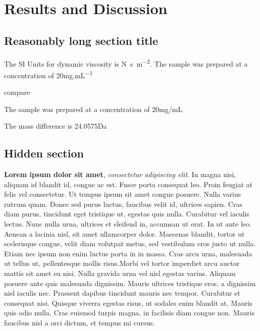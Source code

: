 
\chapter{Results and Discussion}
\label{chapter4}
\ifpdf
    \graphicspath{{Chapter4/Figs/Raster/}{Chapter4/Figs/PDF/}{Chapter4/Figs/}}
\else
    \graphicspath{{Chapter4/Figs/Vector/}{Chapter4/Figs/}}
\fi


\section[Short title]{Reasonably long section title}

The SI Units for dynamic viscosity is \si{\newton\second\per\metre\squared}.
The sample was prepared at a concentration of 20\si{mg}.\si{mL^{-1}}

compare

The sample was prepared at a concentration of 20mg/mL

The mass difference is 24.0575\si{Da}










\clearpage

\tochide\section{Hidden section}
\textbf{Lorem ipsum dolor sit amet}, \textit{consectetur adipiscing elit}. In magna nisi, aliquam id blandit id, congue ac est. Fusce porta consequat leo. Proin feugiat at felis vel consectetur. Ut tempus ipsum sit amet congue posuere. Nulla varius rutrum quam. Donec sed purus luctus, faucibus velit id, ultrices sapien. Cras diam purus, tincidunt eget tristique ut, egestas quis nulla. Curabitur vel iaculis lectus. Nunc nulla urna, ultrices et eleifend in, accumsan ut erat. In ut ante leo. Aenean a lacinia nisl, sit amet ullamcorper dolor. Maecenas blandit, tortor ut scelerisque congue, velit diam volutpat metus, sed vestibulum eros justo ut nulla. Etiam nec ipsum non enim luctus porta in in massa. Cras arcu urna, malesuada ut tellus ut, pellentesque mollis risus.Morbi vel tortor imperdiet arcu auctor mattis sit amet eu nisi. Nulla gravida urna vel nisl egestas varius. Aliquam posuere ante quis malesuada dignissim. Mauris ultrices tristique eros, a dignissim nisl iaculis nec. Praesent dapibus tincidunt mauris nec tempor. Curabitur et consequat nisi. Quisque viverra egestas risus, ut sodales enim blandit at. Mauris quis odio nulla. Cras euismod turpis magna, in facilisis diam congue non. Mauris faucibus nisl a orci dictum, et tempus mi cursus.




